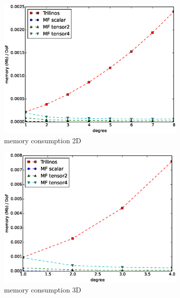 \documentclass[preprint,12pt,times]{elsarticle}
\begin{document}
\begin{figure}[!ht]
  ~
  \begin{subfigure}[b]{0.45\textwidth}
      \centering
      \includegraphics[width=\textwidth]{Emmy_RRZE_memory2d.eps}
      \caption{memory consumption 2D}
      \label{fig:benchmark_miehe_Emmy_memory2}
  \end{subfigure}
  \begin{subfigure}[b]{0.45\textwidth}
    \centering
    \includegraphics[width=\textwidth]{Emmy_RRZE_memory3d.eps}
    \caption{memory consumption 3D}
    \label{fig:benchmark_miehe_Emmy_memory3}
  \end{subfigure}
  ~
  \begin{subfigure}[b]{0.45\textwidth}
    \centering

\end{subfigure}
\end{figure}
\end{document}
